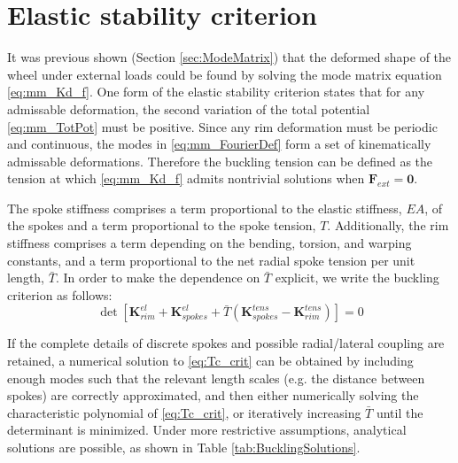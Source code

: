 \documentclass[\rootdir/thesis.tex]{subfiles}
\begin{document}
\section{Elastic stability criterion}
It was previous shown (Section \ref{sec:ModeMatrix}) that the deformed shape of the wheel under external loads could be found by solving the mode matrix equation \eqref{eq:mm_Kd_f}. One form of the elastic stability criterion states that for any admissable deformation, the second variation of the total potential \eqref{eq:mm_TotPot} must be positive. Since any rim deformation must be periodic and continuous, the modes in \eqref{eq:mm_FourierDef} form a set of kinematically admissable deformations. Therefore the buckling tension can be defined as the tension at which \eqref{eq:mm_Kd_f} admits nontrivial solutions when $\mathbf{F}_{ext}=\mathbf{0}.$

The spoke stiffness comprises a term proportional to the elastic stiffness, $EA$, of the spokes and a term proportional to the spoke tension, $T$. Additionally, the rim stiffness comprises a term depending on the bending, torsion, and warping constants, and a term proportional to the net radial spoke tension per unit length, $\bar{T}$. In order to make the dependence on $\bar{T}$ explicit, we write the buckling criterion as follows:
\begin{equation}
\label{eq:Tc_crit}
\det{\left[\mathbf{K}_{rim}^{el} + \mathbf{K}_{spokes}^{el} + \bar{T}(\mathbf{K}_{spokes}^{tens} - \mathbf{K}_{rim}^{tens})\right]} = 0
\end{equation}

If the complete details of discrete spokes and possible radial/lateral coupling are retained, a numerical solution to \eqref{eq:Tc_crit} can be obtained by including enough modes such that the relevant length scales (e.g. the distance between spokes) are correctly approximated, and then either numerically solving the characteristic polynomial of \eqref{eq:Tc_crit}, or iteratively increasing $\bar{T}$ until the determinant is minimized. Under more restrictive assumptions, analytical solutions are possible, as shown in Table \ref{tab:BucklingSolutions}.
\end{document}
